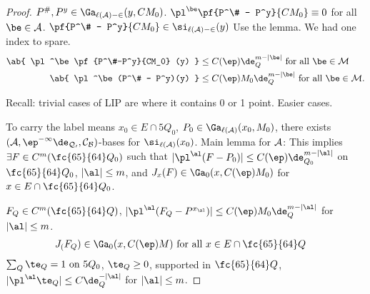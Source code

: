 \begin{proof}
$P^\#,P^y\in \Ga_{\ell(\cal A)-2}(y,CM_0)$. 
$\pl^\be \pf{P^\# - P^y}{CM_0}\equiv 0$ for all $\be \in \cal A$. 
$\pf{P^\# - P^y}{CM_0}\in \si_{\ell(\cal A)-2}(y)$
Use the lemma. We had one index to spare.
\begin{align}
\ab{
\pl^\be \pf{P^\#-P^y}{CM_0} (y)
} &\le C(\ep)\de_Q^{m-|\be|} \text{ for all }\be\in \cal M\\
\ab{
\pl^\be(P^\# - P^y)(y)
}& \le C(\ep) M_0\de_Q^{m-|\be|} \text{ for all }\be \in \cal M.
\end{align}

Recall: trivial cases of LIP are where it contains 0 or 1 point. Easier cases.


To carry the label means $x_0\in E\cap 5Q_0$, $P_0\in \Ga_{\ell(\cal A)}(x_0,M_0)$, there exists $(\cal A, \ep^{-1}\de_{Q_0},C_B)$-bases for $\si_{\ell(\cal A)}(x_0)$. 
Main lemma for $\cal A$: This implies $\exists F\in C^m(\fc{65}{64} Q_0)$ such that $|\pl^\al(F-P_0)| \le C(\ep) \de_{Q_0}^{m-|\al|}$ on $\fc{65}{64}Q_0$, $|\al|\le m$, and $J_x(F)\in \Ga_0(x,C(\ep)M_0)$ for $x\in E\cap \fc{65}{64}Q_0$. 

$F_Q\in C^m(\fc{65}{64} Q)$, $|\pl^\al(F_Q-P^{x_\al})|\le C(\ep) M_0\de_Q^{m-|\al|}$ for $|\al|\le m$. 
\begin{align}
J_(F_Q) &\in \Ga_0(x,C(\ep)M) \text{ for all }x\in E\cap \fc{65}{64}Q
\end{align}
$\sum_Q \te_Q=1 \text{ on }5Q_0$, 
$\te_Q\ge 0$,  supported in $\fc{65}{64}Q$, $|\pl^\al \te_Q|\le C\de_{Q}^{-|\al|}$ for $|\al|\le m$. %


\end{proof}

